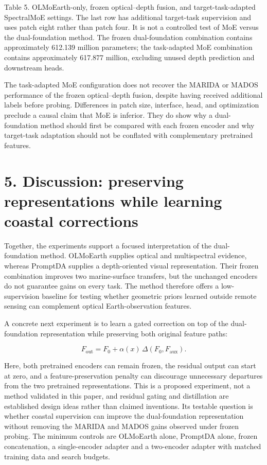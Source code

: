 \documentclass[
  10pt,
  english,
]{article}
\begin{document}
Table 5. OLMoEarth-only, frozen optical--depth fusion, and
target-task-adapted SpectralMoE settings. The last row has additional
target-task supervision and uses patch eight rather than patch four. It
is not a controlled test of MoE versus the dual-foundation method. The
frozen dual-foundation combination contains approximately 612.139
million parameters; the task-adapted MoE combination contains
approximately 617.877 million, excluding unused depth prediction and
downstream heads.

The task-adapted MoE configuration does not recover the MARIDA or MADOS
performance of the frozen optical--depth fusion, despite having received
additional labels before probing. Differences in patch size, interface,
head, and optimization preclude a causal claim that MoE is inferior.
They do show why a dual-foundation method should first be compared with
each frozen encoder and why target-task adaptation should not be
conflated with complementary pretrained features.

\hypertarget{discussion-preserving-representations-while-learning-coastal-corrections}{%
\section{5. Discussion: preserving representations while learning
coastal
corrections}\label{discussion-preserving-representations-while-learning-coastal-corrections}}

Together, the experiments support a focused interpretation of the
dual-foundation method. OLMoEarth supplies optical and multispectral
evidence, whereas PromptDA supplies a depth-oriented visual
representation. Their frozen combination improves two marine-surface
transfers, but the unchanged encoders do not guarantee gains on every
task. The method therefore offers a low-supervision baseline for testing
whether geometric priors learned outside remote sensing can complement
optical Earth-observation features.

A concrete next experiment is to learn a gated correction on top of the
dual-foundation representation while preserving both original feature
paths:

\[
F_{\mathrm{out}}=F_0+\alpha(x)\,\Delta(F_0,F_{\mathrm{aux}}).
\]

Here, both pretrained encoders can remain frozen, the residual output
can start at zero, and a feature-preservation penalty can discourage
unnecessary departures from the two pretrained representations. This is
a proposed experiment, not a method validated in this paper, and
residual gating and distillation are established design ideas rather
than claimed inventions. Its testable question is whether coastal
supervision can improve the dual-foundation representation without
removing the MARIDA and MADOS gains observed under frozen probing. The
minimum controls are OLMoEarth alone, PromptDA alone, frozen
concatenation, a single-encoder adapter and a two-encoder adapter with
matched training data and search budgets.
\end{document}
